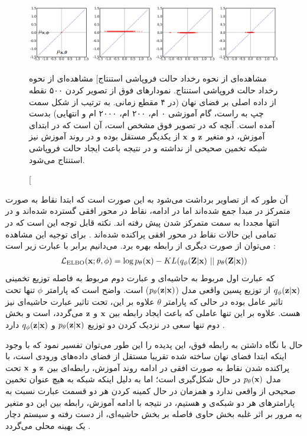\begin{figure}[H]
	\centering
	\includegraphics[width=1.\textwidth]{images/lagging2.png}
	\caption
    [مشاهده‌ای از نحوه رخداد حالت فروپاشی استنتاج]
    {
        مشاهده‌ای از نحوه رخداد حالت فروپاشی استنتاج. نمودارهای فوق از تصویر کردن ۵۰۰ نقطه از داده اصلی بر فضای نهان (در ۴ مقطع زمانی. به ترتیب از شکل سمت چپ به راست، گام آموزشی ۰ ام، ۲۰۰ ام، ۲۰۰۰ ام و انتهایی) بدست آمده است. آنچه که در تصویر فوق مشخص است، آن است که در ابتدای آموزش، دو متغیر ${\bf z}$ و ${\bf x}$ از یکدیگر مستقل بوده و در روند آموزش نیز شبکه \encoder{} تخمین صحیحی از \posteriordist{} نداشته و در نتیجه باعث ایجاد حالت فروپاشی استنتاج می‌شود.
	}
\end{figure}
آن طور که از تصاویر برداشت می‌شود به این صورت است که ابتدا نقاط به صورت متمرکز در مبدا جمع شده‌اند اما در ادامه، نقاط در محور افقی گسترده شده‌اند و در انتها مجددا به سمت متمرکز شدن پیش رفته اند. نکته قابل توجه این است که در تمامی این حالات نقاط در محور افقی پراکنده شده‌اند \cite{infovae}. برای توجیه این مشاهده می‌توان از صورت دیگری از رابطه  بهره برد. می‌دانیم  برابر با عبارت زیر است \cite{vae, vae_lagging}:
\begin{gather}
	\mathcal{L}_{\text{ELBO}}({\bf x};\theta, \phi) = \log p_\theta({\bf x}) - {KL}(q_\phi({\bf Z}|{\bf x})~||~ p_\theta({\bf Z}|{\bf x}))
\end{gather}
که عبارت اول مربوط به \likelihood{} حاشیه‌ای و عبارت دوم مربوط به فاصله توزیع تخمینی $q_\phi({\bf z}|{\bf x})$ از توزیع پسین واقعی مدل ($p_\theta({\bf z}|{\bf x})$) است. واضح است که پارامتر $\phi$ تنها تحت تاثیر عامل  بوده در حالی که پارامتر $\theta$ علاوه بر این، تحت تاثیر عبارت \likelihood{} حاشیه‌ای نیز هست. علاوه بر این تنها عاملی که باعث ایجاد رابطه بین ${\bf x}$ و ${\bf z}$ می‌گردد،
\likelihood{}
است و بخش دوم تنها سعی در نزدیک کردن دو توزیع $p_\theta({\bf z}|{\bf x})$ و $q_\phi({\bf z}|{\bf x})$ دارد \cite{infovae}.

حال با نگاه داشتن به رابطه فوق، این پدیده را این طور می‌توان تفسیر نمود که با وجود اینکه ابتدا فضای نهان ساخته شده تقریبا مستقل از فضای داده‌های ورودی است، با پراکنده شدن نقاط به صورت افقی در ادامه روند آموزش، رابطه‌ای بین ${\bf z}$ و ${\bf x}$ تحت مدل $p_\theta({\bf x})$ در حال شکل‌گیری است؛ اما به دلیل اینکه شبکه \encoder{} به هیچ عنوان تخمین صحیحی از \posteriordist{} واقعی ندارد و همزمان در حال کمینه کردن هر دو قسمت عبارت  نسبت به پارامترهای هر دو شبکه‌ی \encoder{} و \decoder{} هستیم، در نتیجه با ادامه آموزش، رابطه بین این دو متغیر به مرور بر اثر غلبه بخش حاوی فاصله  بر بخش \likelihood{} حاشیه‌ای، از دست رفته و سیستم دچار یک بهینه محلی می‌گردد \cite{infovae}.

